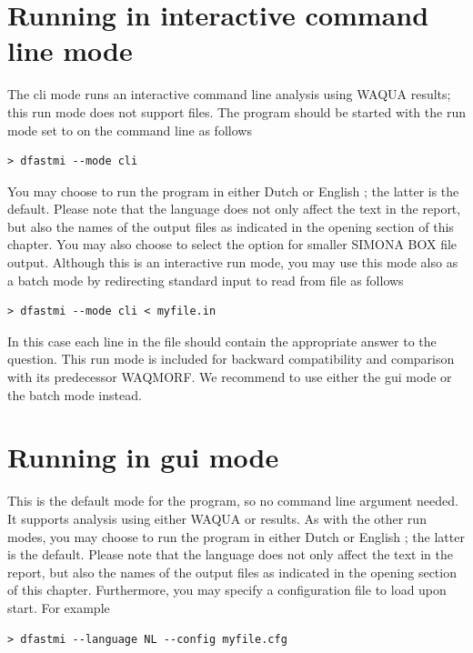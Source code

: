 \section{Running in interactive command line mode}

The cli mode runs an interactive command line analysis using WAQUA results; this run mode does not support \dflowfm files.
The program should be started with the run mode set to  on the command line as follows

\begin{Verbatim}
> dfastmi --mode cli
\end{Verbatim}

You may choose to run the program in either Dutch  or English ; the latter is the default.
Please note that the language does not only affect the text in the report, but also the names of the output files as indicated in the opening section of this chapter.
You may also choose to select the  option for smaller SIMONA BOX file output.
Although this is an interactive run mode, you may use this mode also as a batch mode by redirecting standard input to read from file as follows

\begin{Verbatim}
> dfastmi --mode cli < myfile.in
\end{Verbatim}

In this case each line in the file  should contain the appropriate answer to the question.
This run mode is included for backward compatibility and comparison with its predecessor WAQMORF.
We recommend to use either the gui mode or the batch mode instead.

\section{Running in gui mode}

This is the default mode for the program, so no command line argument needed.
It supports analysis using either WAQUA or \dflowfm results.
As with the other run modes, you may choose to run the program in either Dutch  or English ; the latter is the default.
Please note that the language does not only affect the text in the report, but also the names of the output files as indicated in the opening section of this chapter.
Furthermore, you may specify a configuration file to load upon start.
For example

\begin{Verbatim}
> dfastmi --language NL --config myfile.cfg
\end{Verbatim}

